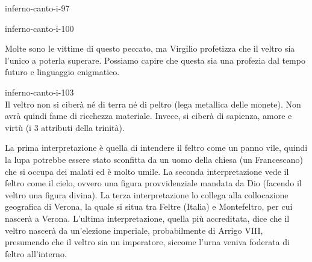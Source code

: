 \documentclass[preview]{standalone}
\begin{document}
\begin{snippet}{inferno-canto-i-97}

\end{snippet}

\begin{snippet}{inferno-canto-i-100}

    Molte sono le vittime di questo peccato, ma Virgilio profetizza che il veltro sia l'unico
    a poterla superare.
    Possiamo capire che questa sia una profezia dal tempo futuro e linguaggio enigmatico.
\end{snippet}

\begin{snippet}{inferno-canto-i-103}
    \\
    Il veltro non si ciberà né di terra né di peltro (lega metallica delle monete).
    Non avrà quindi fame di ricchezza materiale.
    Invece, si ciberà di sapienza, amore e virtù (i 3 attributi della trinità).

    La prima interpretazione è quella di intendere il feltro come un panno vile, quindi la lupa potrebbe
    essere stato sconfitta da un uomo della chiesa (un Francescano) che si occupa dei malati
    ed è molto umile. La seconda interpretazione vede il feltro come il cielo, ovvero una figura provvidenziale
    mandata da Dio (facendo il veltro una figura divina). La terza interpretazione
    lo collega alla collocazione geografica di Verona, la quale si situa tra Feltre (Italia) e Montefeltro, per cui
    nascerà a Verona.
    L'ultima interpretazione, quella più accreditata, dice che il veltro nascerà da un'elezione imperiale,
    probabilmente di Arrigo VIII, presumendo che il veltro sia un imperatore, siccome l'urna
    veniva foderata di feltro all'interno.
\end{snippet}
\end{document}
